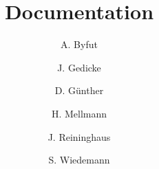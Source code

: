 \documentclass[10pt,pdftex]{amsart}
\title{\FFW Documentation}
\author[Byfut]{A. Byfut}
\author[Gedicke]{J. Gedicke}
\author[G\"unther]{D. G\"unther}
\author[Mellmann]{H. Mellmann}
\author[Reininghaus]{J. Reininghaus}
\author[Wiedemann]{S. Wiedemann}
\begin{document}
\maketitle
\tableofcontents
\pagebreak











\nocite{*}

\end{document}
